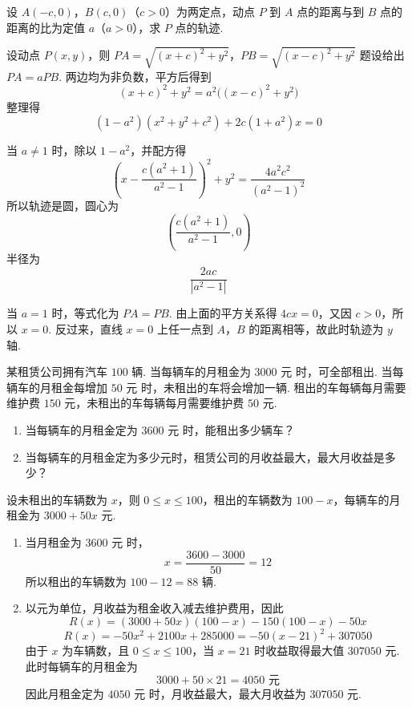 \begin{problem}
设 \(A(-c,0)\)，\(B(c,0)\)（\(c>0\)）为两定点，动点 \(P\) 到 \(A\) 点的距离与到 \(B\) 点的距离的比为定值 \(a\)（\(a>0\)），求 \(P\) 点的轨迹.

\begin{solution}
设动点 \(P(x,y)\)，则
\(PA=\sqrt{(x+c)^2+y^2}\)，\(PB=\sqrt{(x-c)^2+y^2}\)
题设给出 \(PA=aPB\). 两边均为非负数，平方后得到
\[
(x+c)^2+y^2=a^2\bigl((x-c)^2+y^2\bigr)
\]
整理得
\[
(1-a^2)(x^2+y^2+c^2)+2c(1+a^2)x=0
\]

当 \(a\neq1\) 时，除以 \(1-a^2\)，并配方得
\[
\left(x-\frac{c(a^2+1)}{a^2-1}\right)^2+y^2
=\frac{4a^2c^2}{(a^2-1)^2}
\]
所以轨迹是圆，圆心为
\[
\left(\frac{c(a^2+1)}{a^2-1},0\right)
\]
半径为
\[
\frac{2ac}{|a^2-1|}
\]

当 \(a=1\) 时，等式化为 \(PA=PB\). 由上面的平方关系得 \(4cx=0\)，又因 \(c>0\)，所以 \(x=0\). 反过来，直线 \(x=0\) 上任一点到 \(A\)，\(B\) 的距离相等，故此时轨迹为 \(y\) 轴.
\end{solution}
\end{problem}

\begin{problem}
某租赁公司拥有汽车 \(100\) 辆. 当每辆车的月租金为 \(3000\text{ 元}\) 时，可全部租出. 当每辆车的月租金每增加 \(50\text{ 元}\) 时，未租出的车将会增加一辆. 租出的车每辆每月需要维护费 \(150\text{ 元}\)，未租出的车每辆每月需要维护费 \(50\text{ 元}\).

\begin{enumerate}
\item 当每辆车的月租金定为 \(3600\text{ 元}\) 时，能租出多少辆车？
\item 当每辆车的月租金定为多少元时，租赁公司的月收益最大，最大月收益是多少？
\end{enumerate}

\begin{solution}
设未租出的车辆数为 \(x\)，则 \(0\leqslant x\leqslant100\)，租出的车辆数为 \(100-x\)，每辆车的月租金为 \(3000+50x\text{ 元}\).

\begin{enumerate}
\item 当月租金为 \(3600\text{ 元}\) 时，
\[
x=\frac{3600-3000}{50}=12
\]
所以租出的车辆数为 \(100-12=88\text{ 辆}\).

\item 以元为单位，月收益为租金收入减去维护费用，因此
\[
R(x)=(3000+50x)(100-x)-150(100-x)-50x
\]
\[
R(x)=-50x^2+2100x+285000=-50(x-21)^2+307050
\]
由于 \(x\) 为车辆数，且 \(0\leqslant x\leqslant100\)，当 \(x=21\) 时收益取得最大值 \(307050\text{ 元}\). 此时每辆车的月租金为
\[
3000+50\times21=4050\text{ 元}
\]
因此月租金定为 \(4050\text{ 元}\) 时，月收益最大，最大月收益为 \(307050\text{ 元}\).
\end{enumerate}
\end{solution}
\end{problem}

